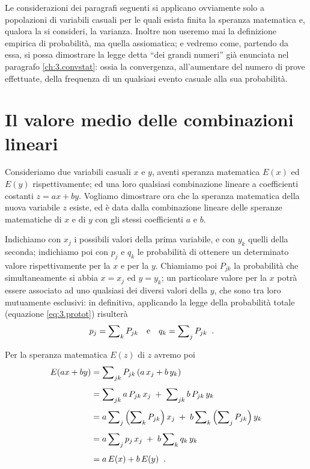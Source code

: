 Le considerazioni dei paragrafi seguenti si applicano
ovviamente solo a popolazioni di variabili casuali per le
quali esista finita la speranza matematica e, qualora la si
consideri, la varianza.  Inoltre non useremo mai la
definizione empirica di probabilit\`a, ma quella
assiomatica; e vedremo come, partendo da essa, si possa
dimostrare la legge detta ``dei grandi numeri''%
gi\`a enunciata nel paragrafo \ref{ch:3.convstat}: ossia la
convergenza, all'aumentare del numero di prove effettuate,
della frequenza di un qualsiasi evento casuale alla sua
probabilit\`a.

\section{Il valore medio delle combinazioni lineari}%
%
%
\label{ch:5.vmclc}
Consideriamo due variabili casuali $x$ e $y$, aventi
speranza matematica $E(x)$ ed $E(y)$ rispettivamente; ed una
loro qualsiasi combinazione lineare a coefficienti costanti
$z = ax + by$.  Vogliamo dimostrare ora che la speranza
matematica della nuova variabile $z$ esiste, ed \`e data
dalla combinazione lineare delle speranze matematiche di $x$
e di $y$ con gli stessi coefficienti $a$ e $b$.

Indichiamo con $x_j$ i possibili valori della prima
variabile, e con $y_k$ quelli della seconda; indichiamo poi
con $p_j$ e $q_k$ le probabilit\`a di ottenere un
determinato valore rispettivamente per la $x$ e per la $y$.
Chiamiamo poi $P_{jk}$ la probabilit\`a che simultaneamente
si abbia $x = x_j$ ed $y = y_k$; un particolare valore per
la $x$ potr\`a essere associato ad uno qualsiasi dei diversi
valori della $y$, che sono tra loro mutuamente esclusivi: in
definitiva, applicando la legge della probabilit\`a totale
(equazione \eqref{eq:3.protot}) risulter\`a
\begin{align*}
    p_j &= \sum \nolimits_k P_{jk} & &\text{e} &
    q_k &= \sum \nolimits_j P_{jk} \;\; .
\end{align*}

Per la speranza matematica $E(z)$ di $z$ avremo poi
\begin{align*}
  E(ax + by) &= \sum \nolimits_{jk} P_{jk} \left(
    a \, x_j + b \, y_k \right) \\[1ex]
  &= \sum \nolimits_{jk} a \, P_{jk} \, x_j \; + \;
    \sum \nolimits_{jk} b \, P_{jk} \, y_k
    \\[1ex]
  &= a \sum \nolimits_j \left( \sum \nolimits_k
    P_{jk} \right) x_j \; + \; b \sum \nolimits_k
    \left( \sum \nolimits_j P_{jk} \right) y_k
    \\[1ex]
  &= a \sum \nolimits_j p_j \, x_j \; + \;
    b \sum \nolimits_k q_k \, y_k \notag \\[1ex]
  &= a \, E(x) + b \, E(y) \;\; .
\end{align*}

